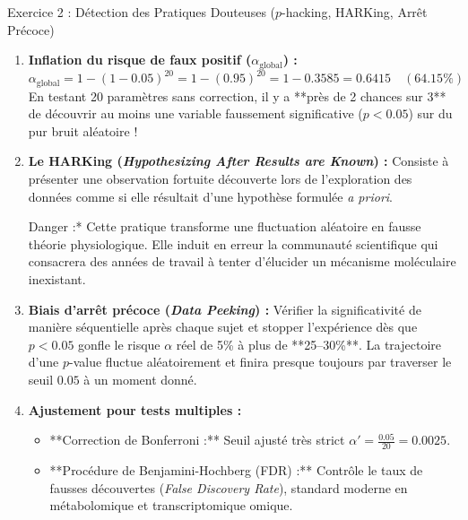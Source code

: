 \documentclass[11pt,a4paper]{article}
\begin{document}
\begin{solutionbox}{Exercice 2 : Détection des Pratiques Douteuses ($p$-hacking, HARKing, Arrêt Précoce)}
\begin{enumerate}[label=\textbf{\alph*.}]
  \item \textbf{Inflation du risque de faux positif ($\alpha_{\text{global}}$) :}
  \begin{equation*}
    \alpha_{\text{global}} = 1 - (1 - 0.05)^{20} = 1 - (0.95)^{20} = 1 - 0.3585 = \mathbf{0.6415} \quad (\mathbf{64.15\%})
  \end{equation*}
  En testant 20 paramètres sans correction, il y a **près de 2 chances sur 3** de découvrir au moins une variable faussement significative ($p < 0.05$) sur du pur bruit aléatoire !

  \item \textbf{Le HARKing (\textit{Hypothesizing After Results are Known}) :}
  Consiste à présenter une observation fortuite découverte lors de l'exploration des données comme si elle résultait d'une hypothèse formulée \textit{a priori}.
  \par *Danger :* Cette pratique transforme une fluctuation aléatoire en fausse théorie physiologique. Elle induit en erreur la communauté scientifique qui consacrera des années de travail à tenter d'élucider un mécanisme moléculaire inexistant.

  \item \textbf{Biais d'arrêt précoce (\textit{Data Peeking}) :}
  Vérifier la significativité de manière séquentielle après chaque sujet et stopper l'expérience dès que $p < 0.05$ gonfle le risque $\alpha$ réel de 5\% à plus de **25--30\%**. La trajectoire d'une $p$-value fluctue aléatoirement et finira presque toujours par traverser le seuil $0.05$ à un moment donné.

  \item \textbf{Ajustement pour tests multiples :}
  \begin{itemize}
    \item **Correction de Bonferroni :** Seuil ajusté très strict $\alpha' = \frac{0.05}{20} = 0.0025$.
    \item **Procédure de Benjamini-Hochberg (FDR) :** Contrôle le taux de fausses découvertes (\textit{False Discovery Rate}), standard moderne en métabolomique et transcriptomique omique.
  \end{itemize}
\end{enumerate}
\end{solutionbox}
\end{document}
